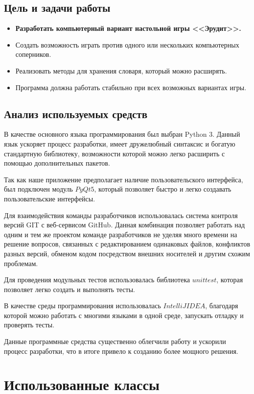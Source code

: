 \documentclass[a4paper,14pt]{article}
\begin{document}
	\subsection{Цель и задачи работы}
	\begin{itemize}
		\item \textbf{Разработать компьютерный вариант настольной игры <<Эрудит>>.}
		\item Создать возможность играть против одного или нескольких компьютерных соперников.
		\item Реализовать методы для хранения словаря, который можно расширять.
		\item Программа должна работать стабильно при всех возможных вариантах игры.
	\end{itemize}

	\subsection{Анализ используемых средств}
	В качестве основного языка программирования был выбран Python 3.
	Данный язык ускоряет процесс разработки, имеет дружелюбный синтаксис и богатую стандартную библиотеку, возможности которой можно легко расширить с помощью дополнительных пакетов.
	
	Так как наше приложение предполагает наличие пользовательского интерфейса, был подключен модуль $PyQt5$, который позволяет быстро и легко создавать пользовательские интерфейсы.
	
	Для взаимодействия команды разработчиков использовалась система контроля версий GIT с веб-сервисом GitHub.
	Данная комбинация позволяет работать над одним и тем же проектом команде разработчиков не уделяя много времени на решение вопросов, связанных с редактированием одинаковых файлов, конфликтов разных версий, обменом кодом посредством внешних носителей и другим схожим проблемам.
	
	Для проведения модульных тестов использовалась библиотека $unittest$, которая позволяет легко создать и выполнять тесты.
	
	В качестве среды программирования использовалась $IntelliJ IDEA$, благодаря которой можно работать с многими языками в одной среде, запускать отладку и проверять тесты.
	
	Данные программные средства существенно облегчили работу  и ускорили процесс разработки, что в итоге привело к созданию более мощного решения.
\section{Использованные классы}	
\end{document}
